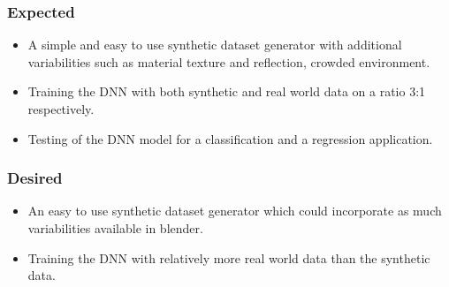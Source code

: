 \documentclass[rnd]{mas_proposal}
\begin{document}
\subsubsection*{Expected}
\begin{itemize}
    \item A simple and easy to use synthetic dataset generator with additional variabilities such as material texture and reflection, crowded environment.
    \item Training the DNN with both synthetic and real world data on a ratio 3:1 respectively.
    \item Testing of the DNN model for a classification and a regression application.
\end{itemize}

\subsubsection*{Desired}
\begin{itemize}
    \item An easy to use synthetic dataset generator which could incorporate as much variabilities available in blender.
    \item Training the DNN with relatively more real world data than the synthetic data.
\end{itemize}


\nocite{*}

\end{document}

